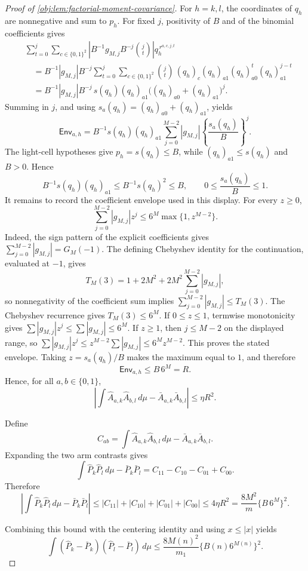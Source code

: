 \documentclass[11pt]{article}
\begin{document}
\begin{proof}[Proof of \cref{obj:lem:factorial-moment-covariance}]
For \(h=k,l\), the coordinates of \(q_h\) are nonnegative and sum to \(p_h\).  For fixed
\(j\), positivity of \(B\) and of the binomial coefficients gives
\[
\begin{aligned}
&\sum_{t=0}^{j}\sum_{c\in\{0,1\}^2}
\left|B^{-1}g_{M,j}B^{-j}\binom jt\right|q_h^{\,r^{a,c,j,t}} \\
&\quad=
B^{-1}|g_{M,j}|B^{-j}
\sum_{t=0}^{j}\sum_{c\in\{0,1\}^2}
\binom jt\,(q_h)_c(q_h)_{a1}(q_h)_{a0}^{t}(q_h)_{a1}^{j-t} \\
&\quad=
B^{-1}|g_{M,j}|B^{-j}
\,s(q_h)(q_h)_{a1}\bigl((q_h)_{a0}+(q_h)_{a1}\bigr)^j.
\end{aligned}
\]
Summing in \(j\), and using \(s_a(q_h)=(q_h)_{a0}+(q_h)_{a1}\), yields
\[
\mathsf{Env}_{a,h}
=
B^{-1}s(q_h)(q_h)_{a1}
\sum_{j=0}^{M-2}|g_{M,j}|\left\{\frac{s_a(q_h)}{B}\right\}^{j}.
\]
The light-cell hypotheses give \(p_h=s(q_h)\le B\), while \((q_h)_{a1}\le s(q_h)\) and
\(B>0\).  Hence
\[
B^{-1}s(q_h)(q_h)_{a1}\le B^{-1}s(q_h)^2\le B,
\qquad
0\le \frac{s_a(q_h)}{B}\le1.
\]
It remains to record the coefficient envelope used in this display.  For every \(z\ge0\),
\[
\sum_{j=0}^{M-2}|g_{M,j}|z^j
\le
6^M\max\{1,z^{M-2}\}.
\]
Indeed, the sign pattern of the explicit coefficients gives
\(\sum_{j=0}^{M-2}|g_{M,j}|=G_M(-1)\).  The defining Chebyshev identity for the continuation,
evaluated at \(-1\), gives
\[
T_M(3)=1+2M^2+2M^2\sum_{j=0}^{M-2}|g_{M,j}|,
\]
so nonnegativity of the coefficient sum implies
\(\sum_{j=0}^{M-2}|g_{M,j}|\le T_M(3)\).  The Chebyshev recurrence gives
\(T_M(3)\le6^M\).  If \(0\le z\le1\), termwise monotonicity gives
\(\sum |g_{M,j}|z^j\le\sum |g_{M,j}|\le6^M\).  If \(z\ge1\), then
\(j\le M-2\) on the displayed range, so
\(\sum |g_{M,j}|z^j\le z^{M-2}\sum |g_{M,j}|\le6^M z^{M-2}\).  This proves the stated
envelope.  Taking \(z=s_a(q_h)/B\) makes the maximum equal to \(1\), and therefore
\[
\mathsf{Env}_{a,h}\le B\,6^M=R.
\]
Hence, for all \(a,b\in\{0,1\}\),
\[
\left|
\int \widehat A_{a,k}\widehat A_{b,l}\,d\mu-
\bar A_{a,k}\bar A_{b,l}
\right|
\le \eta R^2 .
\]

Define
\[
C_{ab}
=
\int \widehat A_{a,k}\widehat A_{b,l}\,d\mu-
\bar A_{a,k}\bar A_{b,l}.
\]
Expanding the two arm contrasts gives
\[
\int \widehat P_k\widehat P_l\,d\mu-
\bar P_k\bar P_l
=
C_{11}-C_{10}-C_{01}+C_{00}.
\]
Therefore
\[
\left|
\int \widehat P_k\widehat P_l\,d\mu-
\bar P_k\bar P_l
\right|
\le
|C_{11}|+|C_{10}|+|C_{01}|+|C_{00}|
\le 4\eta R^2
=
\frac{8M^2}{m}\{B\,6^M\}^2 .
\]

Combining this bound with the centering identity and using \(x\le |x|\) yields
\[
\int(\widehat P_k-\bar P_k)(\widehat P_l-\bar P_l)\,d\mu
\le
\frac{8M(n)^2}{m_1}\{B(n)6^{M(n)}\}^2 .
\]
\end{proof}
\end{document}
